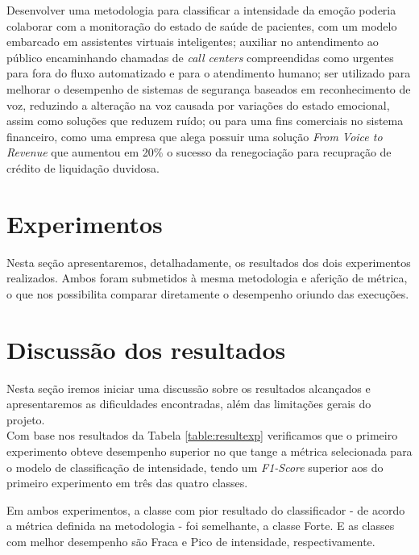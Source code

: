 Desenvolver uma metodologia para classificar a intensidade da emoção poderia colaborar com a monitoração do estado de saúde de pacientes, com um modelo embarcado em assistentes virtuais inteligentes; auxiliar no antendimento ao público encaminhando chamadas de \textit{call centers} compreendidas como urgentes para fora do fluxo automatizado e para o atendimento humano; ser utilizado para melhorar o desempenho de sistemas de segurança baseados em reconhecimento de voz, reduzindo a alteração na voz causada por variações do estado emocional, assim como soluções que reduzem ruído; ou para uma fins comerciais no sistema financeiro, como uma empresa \cite{bsignal0} que alega possuir uma solução \textit{From Voice to Revenue} que aumentou em 20\% o sucesso da renegociação para recupração de crédito de liquidação duvidosa.


\section{Experimentos}

Nesta seção apresentaremos, detalhadamente, os resultados dos dois experimentos realizados. Ambos foram submetidos à mesma metodologia e aferição de métrica, o que nos possibilita comparar diretamente o desempenho oriundo das execuções.\\




\clearpage

\section{Discussão dos resultados}

Nesta seção iremos iniciar uma discussão sobre os resultados alcançados e apresentaremos as dificuldades encontradas, além das limitações gerais do projeto.\\

Com base nos resultados da Tabela \ref{table:resultexp} verificamos que o primeiro experimento obteve desempenho superior no que tange a métrica selecionada para o modelo de classificação de intensidade, tendo um \textit{F1-Score} superior aos do primeiro experimento em três das quatro classes.

Em ambos experimentos, a classe com pior resultado do classificador - de acordo a métrica definida na metodologia - foi semelhante, a classe Forte. E as classes com melhor desempenho são Fraca e Pico de intensidade, respectivamente.

